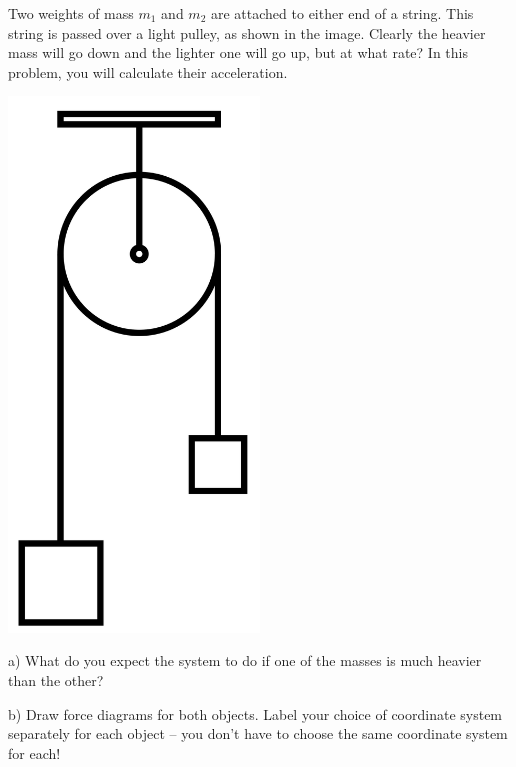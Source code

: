 \documentclass[12pt]{article}
\begin{document}
\Large
\centerline{}
\normalsize
\centerline{}

\begin{minipage}{0.7\textwidth}
Two weights of mass $m_1$ and $m_2$ are attached to either end of a string. This string is passed over a light pulley, as shown in the image.
Clearly the heavier mass will go down and the lighter one will go up, but at what rate? In this problem, you will calculate their acceleration.
\end{minipage} \hfill
\begin{minipage}{0.3\textwidth}
\begin{center}\includegraphics[width=0.5\textwidth]{atwood.png}
\end{center}
\end{minipage} \hfill

a) What do you expect the system to do if one of the masses is much heavier than the other?

\vspace{1in}

b) Draw force diagrams for both objects. Label your choice of coordinate system separately for each object -- you don't have to choose the same coordinate system for each!
\end{document}
